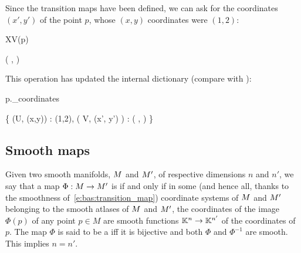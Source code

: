 Since the transition maps have been defined,
we can ask for the coordinates $(x',y')$ of the point $p$, whose $(x,y)$
coordinates were $(1,2)$:
\begin{NBin}
XV(p)
\end{NBin}
\begin{NBoutM}
\left( ,  \right)
\end{NBoutM}
This operation has updated the internal dictionary 
(compare with ):
\begin{NBin}
p._coordinates
\end{NBin}
\begin{NBoutM}
\left\{ (U, (x,y)) : (1,2), \left( V, (x', y') \right) : \left( ,  \right) \right\}
\end{NBoutM}

\subsection{Smooth maps}

Given two smooth manifolds, $M$ and $M'$, of
respective dimensions $n$ and $n'$, we say that a map
$\Phi : M \rightarrow M'$ is  if and only if in some (and hence all, thanks to the smoothness of~\eqref{e:bas:transition_map}) coordinate systems
of $M$ and $M'$ belonging to the smooth atlases of $M$ and $M'$,
the coordinates of the image $\Phi(p)$ of any point $p\in M$
are smooth functions $\mathbb{K}^n\rightarrow \mathbb{K}^{n'}$ of the coordinates of $p$.
The map $\Phi$ is said to be a  iff
it is bijective and both $\Phi$ and $\Phi^{-1}$ are smooth. This implies $n=n'$.

